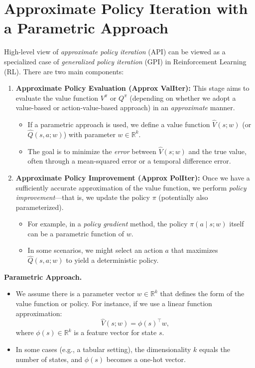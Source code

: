\section{Approximate Policy Iteration with a Parametric Approach}

High-level view of \emph{approximate policy iteration} (API) can be viewed as a specialized 
case of \emph{generalized policy iteration} (GPI) in Reinforcement Learning (RL). 
There are two main components:

\begin{enumerate}
    \item \textbf{Approximate Policy Evaluation (Approx ValIter):}
    This stage aims to evaluate the value function $V^\pi$ or $Q^\pi$ (depending 
    on whether we adopt a value-based or action-value-based approach) in an 
    \emph{approximate} manner.
    \begin{itemize}
        \item If a parametric approach is used, we define a value function 
        $\hat{V}(s; w)$ (or $\hat{Q}(s,a; w)$) with parameter $w \in \mathbb{R}^k$.
        \item The goal is to minimize the \emph{error} between $\hat{V}(s; w)$ 
        and the true value, often through a mean-squared error or a temporal difference error.
    \end{itemize}

    \item \textbf{Approximate Policy Improvement (Approx PolIter):}
    Once we have a sufficiently accurate approximation of the value function, we 
    perform \emph{policy improvement}—that is, we update the policy $\pi$ 
    (potentially also parameterized).
    \begin{itemize}
        \item For example, in a \emph{policy gradient} method, the policy 
        $\pi(a \mid s; w)$ itself can be a parametric function of $w$.
        \item In some scenarios, we might select an action $a$ that maximizes 
        $\hat{Q}(s,a; w)$ to yield a deterministic policy.
    \end{itemize}
\end{enumerate}

\noindent
\textbf{Parametric Approach.}
\begin{itemize}
    \item We assume there is a parameter vector $w \in \mathbb{R}^k$ that defines 
    the form of the value function or policy. For instance, if we use a linear 
    function approximation:
    \[
    \hat{V}(s; w) = \phi(s)^\top w,
    \]
    where $\phi(s) \in \mathbb{R}^k$ is a feature vector for state $s$.
    \item In some cases (e.g., a tabular setting), the dimensionality $k$ equals 
    the number of states, and $\phi(s)$ becomes a one-hot vector.
\end{itemize}

